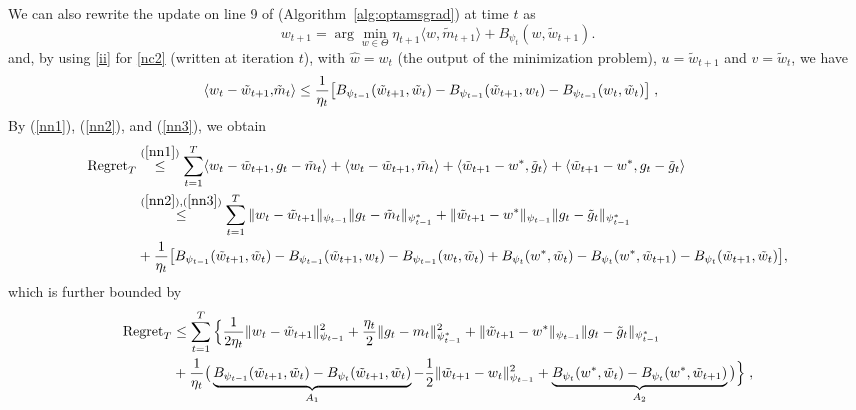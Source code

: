 \documentclass[11pt]{article}
\makeatletter
\renewenvironment{proof}[1][\proofname]{%
   \par\pushQED{\qed}\normalfont%
   \topsep6\p@\@plus6\p@\relax
   \trivlist\item[\hskip\labelsep\bfseries#1]%
   \ignorespaces
}{%
   \popQED\endtrivlist\@endpefalse
}
\theoremstyle{k}
\makeatother
\begin{document}
\begin{proof}
We can also rewrite the update on line 9 of (Algorithm~\ref{alg:optamsgrad}) at time $t$ as
\begin{equation} \label{nc2}
\textstyle w_{t+1} = \arg\min_{w \in \Theta} \eta_{t+1} \langle w, \tilde{m}_{t+1} \rangle + B_{\psi_t}(w, \tilde{w}_{t+1} ).
\end{equation}
and, by using \eqref{ii} for \eqref{nc2} (written at iteration $t$), with $\hat{w} = w_{t}$ (the output of the minimization problem), $u = \tilde{w}_{t+1}$ and $v = \tilde{w}_{t}$, we have
\begin{equation} \label{nn3}
\begin{aligned}
\langle w_t -\tilde{w}_{t+1}, & \tilde{m}_t  \rangle \leq \frac{1}{\eta_t}\big[ B_{\psi_{t-1}}(\tilde{w}_{t+1}, \tilde{w}_{t}) - B_{\psi_{t-1}}(\tilde{w}_{t+1}, w_t ) - B_{\psi_{t-1}}(w_{t}, \tilde{w}_{t}) \big] \;,
\end{aligned}
\end{equation}
By (\ref{nn1}), (\ref{nn2}), and (\ref{nn3}), we obtain
\begin{equation} \label{nnn}
\begin{aligned}
 \text{Regret}_T & \overset{(\ref{nn1})}{\leq} \sum_{t=1}^T \langle  w_t - \tilde{w}_{t+1} , g_t - \tilde{m}_t \rangle + \langle w_t - \tilde{w}_{t+1}, \tilde{m}_t \rangle + \langle \tilde{w}_{t+1} - w^*, \tilde{g}_t  \rangle+ \langle \tilde{w}_{t+1} - w^*,g_t - \tilde{g}_t  \rangle \\
& \overset{(\ref{nn2}), (\ref{nn3})}{\leq}  \sum_{t=1}^T \| w_t - \tilde{w}_{t+1} \|_{\psi_{t-1}} \| g_t - \tilde{m}_t  \|_{\psi_{t-1}^*} + \|  \tilde{w}_{t+1} - w^* \|_{\psi_{t-1}} \| g_t - \tilde{g}_t  \|_{\psi_{t-1}^*}\\
&+ \frac{1}{\eta_t} \big[ B_{\psi_{t-1}}(\tilde{w}_{t+1}, \tilde{w}_{t}) - B_{\psi_{t-1}}(\tilde{w}_{t+1}, w_t ) - B_{\psi_{t-1}}(w_{t}, \tilde{w}_{t}) +  B_{\psi_t}( w^*, \tilde{w}_{t}) -B_{\psi_t}(w^*,  \tilde{w}_{t+1} ) - B_{\psi_t}(\tilde{w}_{t+1}, \tilde{w}_{t}) \big],
\end{aligned}
\end{equation}
which is further bounded by
\begin{equation} \label{nnnn}
\begin{aligned}
 \text{Regret}_T & \leq \sum_{t=1}^T \Big\{ \frac{1}{2 \eta_t} \| w_t - \tilde{w}_{t+1} \|_{\psi_{t-1}}^2 + \frac{\eta_t}{2} \| g_t - m_t  \|_{\psi_{t-1}^*}^2+ \|  \tilde{w}_{t+1} - w^* \|_{\psi_{t-1}} \| g_t - \tilde{g}_t  \|_{\psi_{t-1}^*}\\\
 &  + \frac{1}{\eta_t} \big(\underbrace{B_{\psi_{t-1}}(\tilde{w}_{t+1}, \tilde{w}_{t}) - B_{\psi_t}(\tilde{w}_{t+1}, \tilde{w}_{t}) }_{A_1}- \frac{1}{2} \| \tilde{w}_{t+1} - w_t \|_{\psi_{t-1}}^2+\underbrace{B_{\psi_t}( w^*, \tilde{w}_{t}) -B_{\psi_t}(w^*,  \tilde{w}_{t+1} )}_{A_2}  \big) \Big\} \eqsp,

\end{aligned}
\end{equation}
\end{proof}
\end{document}
